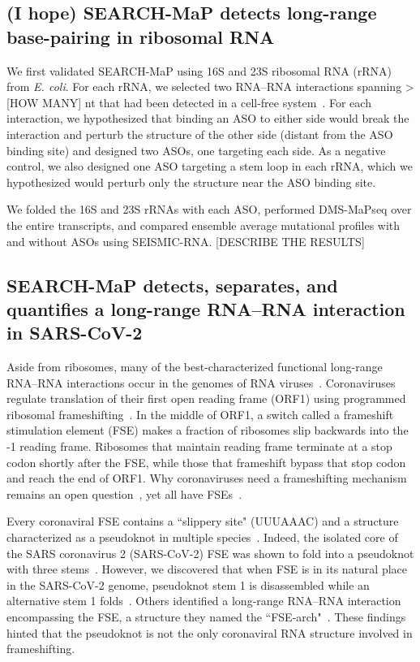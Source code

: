 \documentclass[main.tex]{subfiles}
\begin{document}
\subsection{(I hope) SEARCH-MaP detects long-range base-pairing in ribosomal RNA}

We first validated SEARCH-MaP using 16S and 23S ribosomal RNA (rRNA) from \textit{E. coli}.
For each rRNA, we selected two RNA--RNA interactions spanning > [HOW MANY] nt that had been detected in a cell-free system~\cite{Mustoe2019}.
For each interaction, we hypothesized that binding an ASO to either side would break the interaction and perturb the structure of the other side (distant from the ASO binding site) and designed two ASOs, one targeting each side.
As a negative control, we also designed one ASO targeting a stem loop in each rRNA, which we hypothesized would perturb only the structure near the ASO binding site.

We folded the 16S and 23S rRNAs with each ASO, performed DMS-MaPseq over the entire transcripts, and compared ensemble average mutational profiles with and without ASOs using SEISMIC-RNA.
[DESCRIBE THE RESULTS]

\begin{figure}[H]
	\caption{}
	\label{rrna}
\end{figure}


\subsection{SEARCH-MaP detects, separates, and quantifies a long-range RNA--RNA interaction in SARS-CoV-2}

Aside from ribosomes, many of the best-characterized functional long-range RNA--RNA interactions occur in the genomes of RNA viruses~\cite{Nicholson2014}.
Coronaviruses regulate translation of their first open reading frame (ORF1) using programmed ribosomal frameshifting~\cite{Plant2008}.
In the middle of ORF1, a switch called a frameshift stimulation element (FSE) makes a fraction of ribosomes slip backwards into the -1 reading frame.
Ribosomes that maintain reading frame terminate at a stop codon shortly after the FSE, while those that frameshift bypass that stop codon and reach the end of ORF1.
Why coronaviruses need a frameshifting mechanism remains an open question~\cite{Allan2023}, yet all have FSEs~\cite{Plant2008}.

Every coronaviral FSE contains a ``slippery site" (UUUAAAC) and a structure characterized as a pseudoknot in multiple species~\cite{Brierley1989,Herald1993,Plant2005b}.
Indeed, the isolated core of the SARS coronavirus 2 (SARS-CoV-2) FSE was shown to fold into a pseudoknot with three stems~\cite{KZhang2021,Jones2022}.
However, we discovered that when FSE is in its natural place in the SARS-CoV-2 genome, pseudoknot stem 1 is disassembled while an alternative stem 1 folds~\cite{Lan2022}.
Others identified a long-range RNA--RNA interaction encompassing the FSE, a structure they named the ``FSE-arch"~\cite{Ziv2020}.
These findings hinted that the pseudoknot is not the only coronaviral RNA structure involved in frameshifting.
\end{document}
